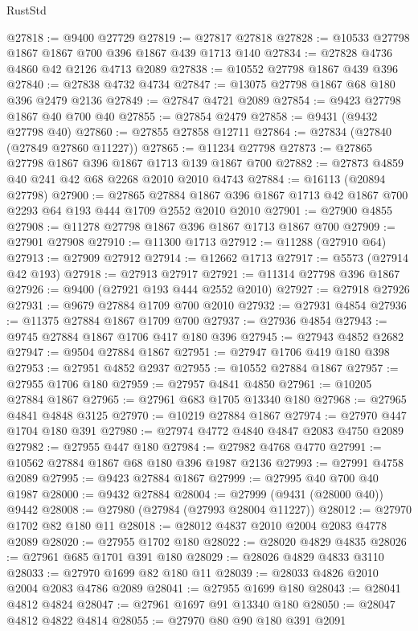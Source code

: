 \begin{lexlean}{RustStd}
\begin{coremodule}
@27818 := @9400 @27729
@27819 := @27817 @27818
@27828 := @10533 @27798 @1867 @1867 @700 @396 @1867 @439 @1713 @140
@27834 := @27828 @4736 @4860 @42 @2126 @4713 @2089
@27838 := @10552 @27798 @1867 @439 @396
@27840 := @27838 @4732 @4734
@27847 := @13075 @27798 @1867 @68 @180 @396 @2479 @2136
@27849 := @27847 @4721 @2089
@27854 := @9423 @27798 @1867 @40 @700 @40
@27855 := @27854 @2479
@27858 := @9431 (@9432 @27798 @40)
@27860 := @27855 @27858 @12711
@27864 := @27834 (@27840 (@27849 @27860 @11227))
@27865 := @11234 @27798
@27873 := @27865 @27798 @1867 @396 @1867 @1713 @139 @1867 @700
@27882 := @27873 @4859 @40 @241 @42 @68 @2268 @2010 @2010 @4743
@27884 := @16113 (@20894 @27798)
@27900 := @27865
    @27884
    @1867
    @396
    @1867
    @1713
    @42
    @1867
    @700
    @2293
    @64
    @193
    @444
    @1709
    @2552
    @2010
    @2010
@27901 := @27900 @4855
@27908 := @11278 @27798 @1867 @396 @1867 @1713 @1867 @700
@27909 := @27901 @27908
@27910 := @11300 @1713
@27912 := @11288 (@27910 @64)
@27913 := @27909 @27912
@27914 := @12662 @1713
@27917 := @5573 (@27914 @42 @193)
@27918 := @27913 @27917
@27921 := @11314 @27798 @396 @1867
@27926 := @9400 (@27921 @193 @444 @2552 @2010)
@27927 := @27918 @27926
@27931 := @9679 @27884 @1709 @700 @2010
@27932 := @27931 @4854
@27936 := @11375 @27884 @1867 @1709 @700
@27937 := @27936 @4854
@27943 := @9745 @27884 @1867 @1706 @417 @180 @396
@27945 := @27943 @4852 @2682
@27947 := @9504 @27884 @1867
@27951 := @27947 @1706 @419 @180 @398
@27953 := @27951 @4852 @2937
@27955 := @10552 @27884 @1867
@27957 := @27955 @1706 @180
@27959 := @27957 @4841 @4850
@27961 := @10205 @27884 @1867
@27965 := @27961 @683 @1705 @13340 @180
@27968 := @27965 @4841 @4848 @3125
@27970 := @10219 @27884 @1867
@27974 := @27970 @447 @1704 @180 @391
@27980 := @27974 @4772 @4840 @4847 @2083 @4750 @2089
@27982 := @27955 @447 @180
@27984 := @27982 @4768 @4770
@27991 := @10562 @27884 @1867 @68 @180 @396 @1987 @2136
@27993 := @27991 @4758 @2089
@27995 := @9423 @27884 @1867
@27999 := @27995 @40 @700 @40 @1987
@28000 := @9432 @27884
@28004 := @27999 (@9431 (@28000 @40)) @9442
@28008 := @27980 (@27984 (@27993 @28004 @11227))
@28012 := @27970 @1702 @82 @180 @11
@28018 := @28012 @4837 @2010 @2004 @2083 @4778 @2089
@28020 := @27955 @1702 @180
@28022 := @28020 @4829 @4835
@28026 := @27961 @685 @1701 @391 @180
@28029 := @28026 @4829 @4833 @3110
@28033 := @27970 @1699 @82 @180 @11
@28039 := @28033 @4826 @2010 @2004 @2083 @4786 @2089
@28041 := @27955 @1699 @180
@28043 := @28041 @4812 @4824
@28047 := @27961 @1697 @91 @13340 @180
@28050 := @28047 @4812 @4822 @4814
@28055 := @27970 @80 @90 @180 @391 @2091

\end{coremodule}
\end{lexlean}
